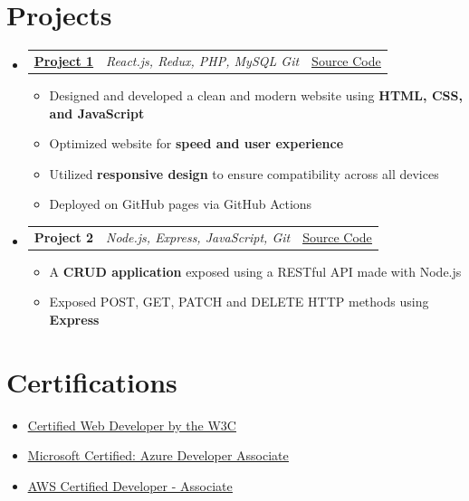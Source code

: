 \documentclass[a4paper,11pt]{article}
\makeatletter
\newcommand{\resumeItem}[1]{
  \item\small{#1}
}
\newcommand{\resumeItemListStart}{\begin{itemize}[rightmargin=0.11in]}
\newcommand{\resumeItemListEnd}{\end{itemize}}
\newcommand{\resumeTrioHeading}[3]{
  \item\small{
    \begin{tabular*}{0.96\textwidth}[t]{
      l@{\extracolsep{\fill}}c@{\extracolsep{\fill}}r
    }
      \textbf{#1} & \textit{#2} & #3
    \end{tabular*}
  }
}
\newcommand{\resumeHeadingListStart}{
  \begin{itemize}[leftmargin=0.15in, label={}]
}
\newcommand{\resumeHeadingListEnd}{\end{itemize}}
\makeatother
\begin{document}
\section{Projects}
  \resumeHeadingListStart{}
    \resumeTrioHeading{\href{https://example.com/project}{\uline{Project 1}}}{React.js, Redux, PHP, MySQL Git}{\href{https://example.com/project/code}{\uline{Source Code}}}
      \resumeItemListStart{}
        \resumeItem{Designed and developed a clean and modern website using \textbf{HTML, CSS, and JavaScript}}
        \resumeItem{Optimized website for \textbf{speed and user experience}}
        \resumeItem{Utilized \textbf{responsive design} to ensure compatibility across all devices}
        \resumeItem{Deployed on GitHub pages via GitHub Actions}
      \resumeItemListEnd{}

      \resumeTrioHeading{Project 2}{Node.js, Express, JavaScript, Git}{\href{https:project2.com/source-code}{\uline{Source Code}}}
      \resumeItemListStart{}
        \resumeItem{A \textbf{CRUD application} exposed using a RESTful API made with Node.js}
        \resumeItem{Exposed POST, GET, PATCH and DELETE HTTP methods using \textbf{Express}}
      \resumeItemListEnd{}
  \resumeHeadingListEnd{}



\section{Certifications}
  \resumeItemListStart{}
    \resumeItem{\href{https://example.com/certification}{\uline{Certified Web Developer by the W3C}}}
    \resumeItem{\href{https://example.com/certification}{\uline{Microsoft Certified: Azure Developer Associate}}}
    \resumeItem{\href{https://example.com/certification}{\uline{AWS Certified Developer - Associate}}}
  \resumeItemListEnd{}
\end{document}

